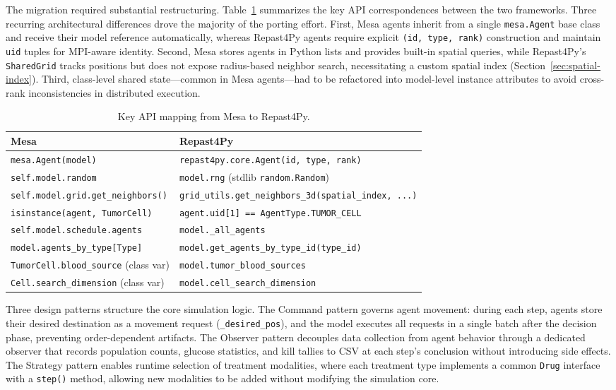 The migration required substantial restructuring.  Table~\ref{tab:porting-mapping} summarizes the key API correspondences between the two frameworks.  Three recurring architectural differences drove the majority of the porting effort.  First, Mesa agents inherit from a single \texttt{mesa.Agent} base class and receive their model reference automatically, whereas Repast4Py agents require explicit \texttt{(id, type, rank)} construction and maintain \texttt{uid} tuples for MPI-aware identity.  Second, Mesa stores agents in Python lists and provides built-in spatial queries, while Repast4Py's \texttt{SharedGrid} tracks positions but does not expose radius-based neighbor search, necessitating a custom spatial index (Section~\ref{sec:spatial-index}).  Third, class-level shared state---common in Mesa agents---had to be refactored into model-level instance attributes to avoid cross-rank inconsistencies in distributed execution.

\begin{table}[htbp]
\centering
\caption{Key API mapping from Mesa to Repast4Py.}
\label{tab:porting-mapping}
\begin{tabular}{@{}p{6cm}p{7.5cm}@{}}
\toprule
\textbf{Mesa} & \textbf{Repast4Py} \\
\midrule
\texttt{mesa.Agent(model)} & \texttt{repast4py.core.Agent(id, type, rank)} \\
\texttt{self.model.random} & \texttt{model.rng} (stdlib \texttt{random.Random}) \\
{\small\texttt{self.model.grid.get\_neighbors()}} & {\small\texttt{grid\_utils.get\_neighbors\_3d(\allowbreak spatial\_index, ...)}} \\
\texttt{isinstance(agent, TumorCell)} & \texttt{agent.uid[1] == AgentType.TUMOR\_CELL} \\
\texttt{self.model.schedule.agents} & \texttt{model.\_all\_agents} \\
\texttt{model.agents\_by\_type[Type]} & \texttt{model.get\_agents\_by\_type\_id(type\_id)} \\
\texttt{TumorCell.blood\_source} (class var) & \texttt{model.tumor\_blood\_sources} \\
\texttt{Cell.search\_dimension} (class var) & \texttt{model.cell\_search\_dimension} \\
\bottomrule
\end{tabular}
\end{table}

Three design patterns structure the core simulation logic. The Command pattern governs agent movement: during each step, agents store their desired destination as a movement request (\texttt{\_desired\_pos}), and the model executes all requests in a single batch after the decision phase, preventing order-dependent artifacts. The Observer pattern decouples data collection from agent behavior through a dedicated observer that records population counts, glucose statistics, and kill tallies to CSV at each step's conclusion without introducing side effects. The Strategy pattern enables runtime selection of treatment modalities, where each treatment type implements a common \texttt{Drug} interface with a \texttt{step()} method, allowing new modalities to be added without modifying the simulation core.

